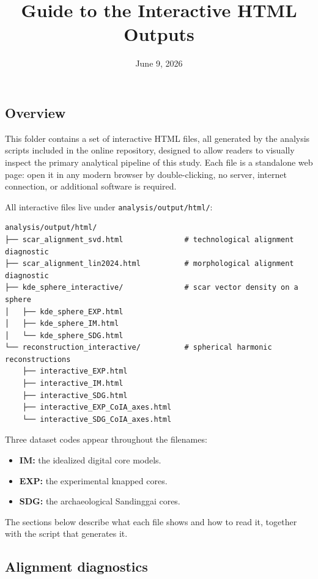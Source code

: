 \documentclass[
  letterpaper,
  DIV=11,
  numbers=noendperiod]{scrartcl}
\title{Guide to the Interactive HTML Outputs}
\author{}
\date{June 9, 2026}
\providecommand{\tightlist}{%
  \setlength{\itemsep}{0pt}\setlength{\parskip}{0pt}}
\begin{document}
\maketitle


\subsection{Overview}\label{overview}

This folder contains a set of interactive HTML files, all generated by
the analysis scripts included in the online repository, designed to
allow readers to visually inspect the primary analytical pipeline of
this study. Each file is a standalone web page: open it in any modern
browser by double-clicking, no server, internet connection, or
additional software is required.

All interactive files live under \texttt{analysis/output/html/}:

\begin{verbatim}
analysis/output/html/
├── scar_alignment_svd.html              # technological alignment diagnostic
├── scar_alignment_lin2024.html          # morphological alignment diagnostic
├── kde_sphere_interactive/              # scar vector density on a sphere
│   ├── kde_sphere_EXP.html
│   ├── kde_sphere_IM.html
│   └── kde_sphere_SDG.html
└── reconstruction_interactive/          # spherical harmonic reconstructions
    ├── interactive_EXP.html
    ├── interactive_IM.html
    ├── interactive_SDG.html
    ├── interactive_EXP_CoIA_axes.html
    └── interactive_SDG_CoIA_axes.html
\end{verbatim}

Three dataset codes appear throughout the filenames:

\begin{itemize}
\tightlist
\item
  \textbf{IM:} the idealized digital core models.
\item
  \textbf{EXP:} the experimental knapped cores.
\item
  \textbf{SDG:} the archaeological Sandinggai cores.
\end{itemize}

The sections below describe what each file shows and how to read it,
together with the script that generates it.

\subsection{Alignment diagnostics}\label{alignment-diagnostics}
\end{document}
